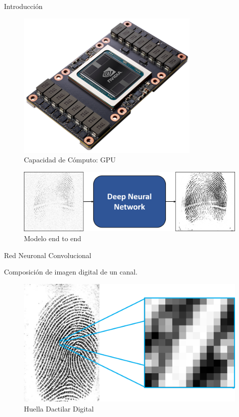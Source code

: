 \documentclass[12pt,aspectratio=169]{beamer}
\begin{document}
\begin{frame}{Introducción}

    \begin{figure}[h]
        \includegraphics[scale=0.3]{figs/nvidia_card.png}
        \caption{Capacidad de Cómputo: GPU}
    \end{figure}
    
    \begin{figure}[h]
        \includegraphics[scale=0.3]{figs/end_to_end.png}
        \caption{Modelo end to end}
    \end{figure}

\end{frame}

\begin{frame}{Red Neuronal Convolucional}

    Composición de imagen digital de un canal.

    \begin{figure}[h]
        \includegraphics[scale=0.45]{figs/huella_pixeles.png}
        \caption{Huella Dactilar Digital}
    \end{figure}

\end{frame}
\end{document}
